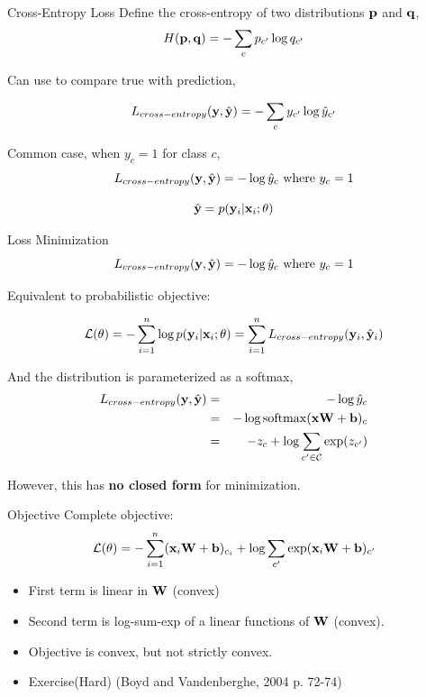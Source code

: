 \documentclass{beamer}
\begin{document}
\begin{frame}{Cross-Entropy Loss}
  Define the cross-entropy of two distributions $\mathbf{p}$ and $\mathbf{q}$,
  \[ H(\mathbf{p}, \mathbf{q})= -\sum_{c}p_{c'} \log q_{c'}  \]

  Can use to compare true with prediction,

  \[L_{cross-entropy}(\mathbf{y}, \hat{\mathbf{y}}) = - \sum_{c} y_{c'} \log \hat{y}_{c'} \]

  Common case, when $y_c = 1$ for class $c$,
  \[L_{cross-entropy}(\mathbf{y}, \hat{\mathbf{y}}) = - \log \hat{y}_c \mathrm{\ where\ }y_c = 1 \]

  \[ \hat{\mathbf{y}} = p(\mathbf{y}_i | \mathbf{x}_i; \theta) \]
\end{frame}

\begin{frame}{Loss Minimization}
    \[ L_{cross-entropy}(\mathbf{y}, \hat{\mathbf{y}})=  - \log \hat{y}_c \mathrm{\ where\ }y_c = 1   \]

  Equivalent to probabilistic objective:

  \[ \mathcal{L}(\theta) =  - \sum_{i=1}^n \log p(\mathbf{y}_i | \mathbf{x}_i; \theta) = \sum_{i=1}^n L_{cross-entropy}(\mathbf{y}_i, \hat{\mathbf{y}}_i) \]


  And the distribution is parameterized as a softmax,
  \begin{eqnarray*}
    L_{cross-entropy}(\boldy, \hat{\boldy}) &=& - \log \hat{y}_c\\
    &=& -\log \softmax(\boldx \boldW + \bold b)_c \\
    &=& - z_c + \log \sum_{c' \in \mcC} \exp(z_{c'})
  \end{eqnarray*}

  However, this has \textbf{no closed form} for minimization.

\end{frame}

\begin{frame}{Objective}
  Complete objective:
  \[ \mathcal{L}(\theta) =  - \sum_{i=1}^n (\mathbf{x}_i \mathbf{W} + \mathbf{b} )_{c_i}  + \log \sum_{c'} \exp  (\mathbf{x}_i \mathbf{W}  + \mathbf{b} )_{c'} \]
  \begin{itemize}
  \item First term is linear in $\mathbf{W}$ (convex)
  \item Second term is log-sum-exp of a linear functions of $\mathbf{W}$ (convex).
  \item Objective is convex, but not strictly convex.
  \item Exercise(Hard) (Boyd and  Vandenberghe, 2004 p. 72-74)
  \end{itemize}
\end{frame}
\end{document}
